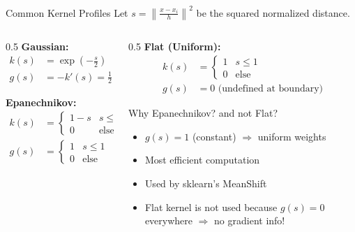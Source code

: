 \begin{frame}{Common Kernel Profiles}
    \small
    Let $s = \left\|\frac{x - x_i}{h}\right\|^2$ be the squared normalized distance.
    \vspace{0.2cm}
    \begin{columns}[T]
        \begin{column}{0.5\textwidth}
            \textbf{Gaussian:}
            \begin{align*}
            k(s) &= \exp\left(-\frac{s}{2}\right) \\
            g(s) &= -k'(s) = \frac{1}{2}\exp\left(-\frac{s}{2}\right)
            \end{align*}

            \vspace{0.3cm}

            \textbf{Epanechnikov:}
            \begin{align*}
            k(s) &= \begin{cases} 1 - s & s \leq 1 \\ 0 & \text{else} \end{cases} \\
            g(s) &= \begin{cases} 1 & s \leq 1 \\ 0 & \text{else} \end{cases}
            \end{align*}
        \end{column}

        \begin{column}{0.5\textwidth}
            \textbf{Flat (Uniform):}
            \begin{align*}
            k(s) &= \begin{cases} 1 & s \leq 1 \\ 0 & \text{else} \end{cases} \\
            g(s) &= 0 \text{ (undefined at boundary)}
            \end{align*}

            \vspace{0.3cm}

            \small{\textcolor{customred}{Why Epanechnikov? and not Flat?}}
            \begin{itemize}
                \item $g(s) = 1$ (constant) $\Rightarrow$ uniform weights
                \item Most efficient computation
                \item Used by sklearn's MeanShift
                \item Flat kernel is not used because $g(s) = 0$ everywhere $\Rightarrow$ no gradient info!
            \end{itemize}
        \end{column}
    \end{columns}
\end{frame}


